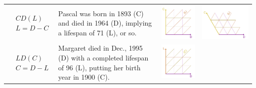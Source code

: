 \documentclass[12pt,oneside,a4paper]{article} %
\begin{document}
\begin{longtable}{m{}L{0.37\textwidth}m{0.17\textwidth}m{0.2\textwidth}}
  $$\begin{aligned}
    &CD(L) \\
    &L = D - C
  \end{aligned}$$ &
  Pascal was born in 1893 (C) and died in 1964 (D), implying a lifespan of 71 (L), or so. &
  \includegraphics[scale=.5]{Figures/DiagramTable/CD_rt.pdf} &
  \includegraphics[scale=.5]{Figures/DiagramTable/CD_iso.pdf}  \\
  $$\begin{aligned}
    &LD(C) \\
    &C = D - L
  \end{aligned}$$ &
  Margaret died in Dec., 1995 (D) with a completed lifespan of 96 (L), putting her birth year in 1900 (C). &
  \includegraphics[scale=.5]{Figures/DiagramTable/LD_rt.pdf} &

\end{longtable}
\end{document}
